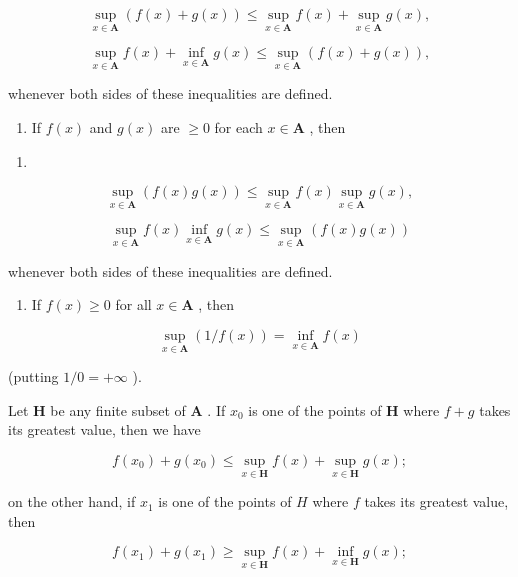 \[
\sup _ {x \in \mathbf {A}} (f (x) + g (x)) \leqslant \sup _ {x \in \mathbf {A}} f (x) + \sup _ {x \in \mathbf {A}} g (x),\tag{17}
\]

\[
\sup _ {x \in \mathbf {A}} f (x) + \inf _ {x \in \mathbf {A}} g (x) \leqslant \sup _ {x \in \mathbf {A}} (f (x) + g (x)),\tag{18}
\]

whenever both sides of these inequalities are defined.

\begin{enumerate}
\def\labelenumi{(\roman{enumi})}
\setcounter{enumi}{1}
\tightlist
\item
  If \(f(x)\) and \(g(x)\) are \(\geqslant 0\) for each \(x \in \mathbf{A}\) , then
\end{enumerate}

\begin{enumerate}
\def\labelenumi{(\arabic{enumi})}
\setcounter{enumi}{18}
\tightlist
\item
\end{enumerate}

\[
\sup _ {x \in \mathbf {A}} (f (x) g (x)) \leqslant \sup _ {x \in \mathbf {A}} f (x) \sup _ {x \in \mathbf {A}} g (x),\tag{19}
\]

\[
\sup _ {x \in \mathbf {A}} f (x) \inf _ {x \in \mathbf {A}} g (x) \leqslant \sup _ {x \in \mathbf {A}} (f (x) g (x))\tag{20}
\]

whenever both sides of these inequalities are defined.

\begin{enumerate}
\def\labelenumi{(\roman{enumi})}
\setcounter{enumi}{2}
\tightlist
\item
  If \(f(x) \geqslant 0\) for all \(x \in \mathbf{A}\) , then
\end{enumerate}

\[
\sup _ {x \in \mathbf {A}} (1 / f (x)) = \inf _ {x \in \mathbf {A}} f (x)\tag{21}
\]

(putting \(1 / 0 = +\infty\) ).

Let \(\mathbf{H}\) be any finite subset of \(\mathbf{A}\) . If \(x_0\) is one of the points of \(\mathbf{H}\) where \(f + g\) takes its greatest value, then we have

\[
f (x _ {0}) + g (x _ {0}) \leqslant \sup _ {x \in \mathbf {H}} f (x) + \sup _ {x \in \mathbf {H}} g (x);
\]

on the other hand, if \(x_{1}\) is one of the points of \(H\) where \(f\) takes its greatest value, then

\[
f (x _ {1}) + g (x _ {1}) \geqslant \sup _ {x \in \mathbf {H}} f (x) + \inf _ {x \in \mathbf {H}} g (x);
\]

